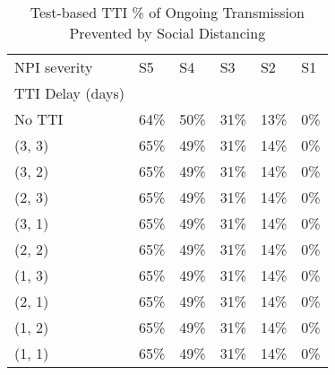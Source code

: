 \documentclass{article}
\begin{document}
    


    \begin{table}[H]
        \centering
         \begin{tabular}{llllll}
\toprule
NPI severity &    S5 &    S4 &    S3 &    S2 &   S1 \\
TTI Delay (days) &       &       &       &       &      \\
\midrule
No TTI           &  64\% &  50\% &  31\% &  13\% &  0\% \\
(3, 3)           &  65\% &  49\% &  31\% &  14\% &  0\% \\
(3, 2)           &  65\% &  49\% &  31\% &  14\% &  0\% \\
(2, 3)           &  65\% &  49\% &  31\% &  14\% &  0\% \\
(3, 1)           &  65\% &  49\% &  31\% &  14\% &  0\% \\
(2, 2)           &  65\% &  49\% &  31\% &  14\% &  0\% \\
(1, 3)           &  65\% &  49\% &  31\% &  14\% &  0\% \\
(2, 1)           &  65\% &  49\% &  31\% &  14\% &  0\% \\
(1, 2)           &  65\% &  49\% &  31\% &  14\% &  0\% \\
(1, 1)           &  65\% &  49\% &  31\% &  14\% &  0\% \\
\bottomrule
\end{tabular}

        \caption{Test-based TTI \% of Ongoing Transmission Prevented by Social Distancing}
    \end{table}
    
\end{document}
